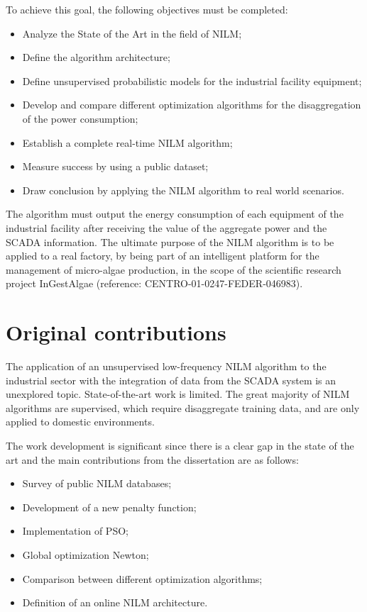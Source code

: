 To achieve this goal, the following objectives must be completed:
\begin{itemize}
    \item Analyze the State of the Art in the field of NILM;
    \item Define the algorithm architecture;
    \item Define unsupervised probabilistic models for the industrial facility equipment;
    \item Develop and compare different optimization algorithms for the disaggregation of the power consumption;
    \item Establish a complete real-time NILM algorithm;
    \item Measure success by using a public dataset;
    \item Draw conclusion by applying the NILM algorithm to real world scenarios.
\end{itemize}

The algorithm must output the energy consumption of each equipment of the industrial facility after receiving the value of the aggregate power and the SCADA information.
The ultimate purpose of the NILM algorithm is to be applied to a real factory, by being part of an intelligent platform for the management of micro-algae production, in the scope of the scientific research project InGestAlgae (reference: CENTRO-01-0247-FEDER-046983).


\section{Original contributions}
The application of an unsupervised low-frequency NILM algorithm to the industrial sector with the integration of data from the SCADA system is an unexplored topic.
State-of-the-art work is limited. The great majority of NILM algorithms are supervised, which require disaggregate training data, and are only applied to domestic environments.

The work development is significant since there is a clear gap in the state of the art and the main contributions from the dissertation are as follows:

\begin{itemize}
    \item Survey of public NILM databases;
    \item Development of a new penalty function;
    \item Implementation of PSO;
    \item Global optimization Newton;
    \item Comparison between different optimization algorithms;
    \item Definition of an online NILM architecture.
\end{itemize}

